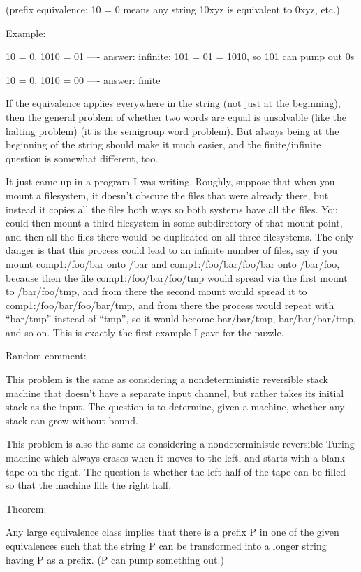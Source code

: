 \documentclass{book}
\begin{document}
(prefix equivalence: 10 = 0 means any string 10xyz is equivalent to 0xyz, etc.)

Example:

10 = 0, 1010 = 01   ---- answer: infinite: 101 = 01 = 1010, so 101 can pump out 0s

10 = 0, 1010 = 00   ---- answer: finite


If the equivalence applies everywhere in the string (not just at the beginning), then the general problem of whether two words are equal is unsolvable (like the halting problem) (it is the semigroup word problem).  But always being at the beginning of the string should make it much easier, and the finite/infinite question is somewhat different, too.

It just came up in a program I was writing.  Roughly, suppose that when you mount a filesystem, it doesn't obscure the files that were already there, but instead it copies all the files both ways so both systems have all the files.  You could then mount a third filesystem in some subdirectory of that mount point, and then all the files there would be duplicated on all three filesystems.  The only danger is that this process could lead to an infinite number of files, say if you mount comp1:/foo/bar onto /bar and comp1:/foo/bar/foo/bar onto /bar/foo, because then the file comp1:/foo/bar/foo/tmp would spread via the first mount to /bar/foo/tmp, and from there the second mount would spread it to comp1:/foo/bar/foo/bar/tmp, and from there the process would repeat with ``bar/tmp'' instead of ``tmp'', so it would become bar/bar/tmp, bar/bar/bar/tmp, and so on.  This is exactly the first example I gave for the puzzle.


Random comment:

This problem is the same as considering a nondeterministic reversible stack machine that doesn't have a separate input channel, but rather takes its initial stack as the input.  The question is to determine, given a machine, whether any stack can grow without bound.

This problem is also the same as considering a nondeterministic reversible Turing machine which always erases when it moves to the left, and starts with a blank tape on the right.  The question is whether the left half of the tape can be filled so that the machine fills the right half.


Theorem:

Any large equivalence class implies that there is a prefix P in one of the given equivalences such that the string P can be transformed into a longer string having P as a prefix.  (P can pump something out.)
\end{document}
